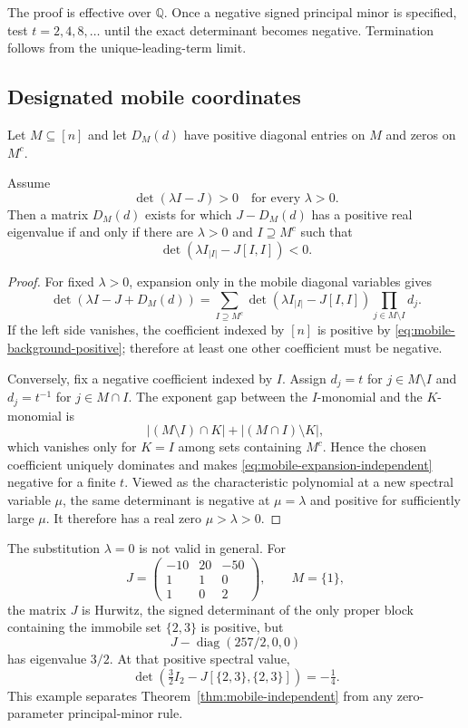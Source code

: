 \begin{remark}
The proof is effective over $\mathbb Q$.  Once a negative signed principal
minor is specified, test $t=2,4,8,\ldots$ until the exact determinant becomes
negative.  Termination follows from the unique-leading-term limit.
\end{remark}

\subsection{Designated mobile coordinates}
Let $M\subseteq[n]$ and let $D_M(d)$ have positive diagonal entries on $M$
and zeros on $M^c$.

\begin{theorem}
\label{thm:mobile-independent}
Assume
\[
 \det(\lambda I-J)>0\quad\text{for every }\lambda>0.
 \label{eq:mobile-background-positive}
\]
Then a matrix $D_M(d)$ exists for which $J-D_M(d)$ has a positive real
eigenvalue if and only if there are $\lambda>0$ and
$I\supseteq M^c$ such that
\[
 \det(\lambda I_{|I|}-J[I,I])<0.
 \label{eq:mobile-block-independent}
\]
\end{theorem}

\begin{proof}
For fixed $\lambda>0$, expansion only in the mobile diagonal variables gives
\begin{equation}
 \det(\lambda I-J+D_M(d))
 =\sum_{I\supseteq M^c}
 \det(\lambda I_{|I|}-J[I,I])
 \prod_{j\in M\setminus I}d_j.
 \label{eq:mobile-expansion-independent}
\end{equation}
If the left side vanishes, the coefficient indexed by $[n]$ is positive by
\eqref{eq:mobile-background-positive}; therefore at least one other
coefficient must be negative.

Conversely, fix a negative coefficient indexed by $I$.  Assign $d_j=t$ for
$j\in M\setminus I$ and $d_j=t^{-1}$ for $j\in M\cap I$.  The exponent gap
between the $I$-monomial and the $K$-monomial is
\[
 |(M\setminus I)\cap K|+|(M\cap I)\setminus K|,
\]
which vanishes only for $K=I$ among sets containing $M^c$.  Hence the chosen
coefficient uniquely dominates and makes
\eqref{eq:mobile-expansion-independent} negative for a finite $t$.  Viewed as
the characteristic polynomial at a new spectral variable $\mu$, the same
determinant is negative at $\mu=\lambda$ and positive for sufficiently large
$\mu$.  It therefore has a real zero $\mu>\lambda>0$.
\end{proof}

The substitution $\lambda=0$ is not valid in general.  For
\[
 J=\begin{pmatrix}-10&20&-50\\1&1&0\\1&0&2\end{pmatrix},
 \qquad M=\{1\},
\]
the matrix $J$ is Hurwitz, the signed determinant of the only proper block
containing the immobile set $\{2,3\}$ is positive, but
\[
 J-\operatorname{diag}(257/2,0,0)
\]
has eigenvalue $3/2$.  At that positive spectral value,
\[
 \det\!\left(\tfrac32I_2-J[\{2,3\},\{2,3\}]\right)=-\tfrac14.
\]
This example separates Theorem~\ref{thm:mobile-independent} from any
zero-parameter principal-minor rule.
